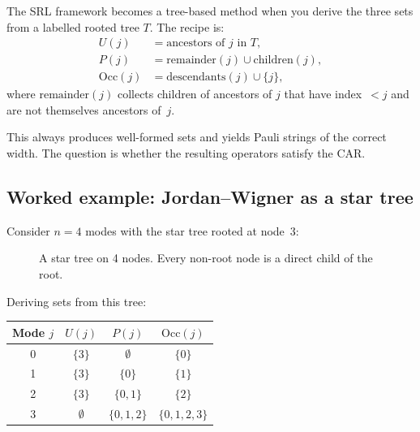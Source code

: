 \documentclass[11pt,a4paper]{article}
\newcommand{\Occ}[1]{\mathrm{Occ}(#1)}
\theoremstyle{definition}
\begin{document}
The SRL framework becomes a tree-based method when you derive the
three sets from a labelled rooted tree $T$.  The recipe is:
\begin{align*}
  U(j) &= \text{ancestors of } j \text{ in } T, \\
  P(j) &= \text{remainder}(j) \cup \text{children}(j), \\
  \Occ{j} &= \text{descendants}(j) \cup \{j\},
\end{align*}
where $\text{remainder}(j)$ collects children of ancestors of $j$
that have index~$< j$ and are not themselves ancestors of~$j$.

This always produces well-formed sets and yields Pauli strings of
the correct width.  The question is whether the resulting operators
satisfy the CAR.

\subsection{Worked example: Jordan--Wigner as a star tree}

Consider $n = 4$ modes with the star tree rooted at node~3:

\begin{figure}[h]
\centering
{}
\caption{A star tree on 4 nodes.  Every non-root node is a direct
child of the root.}
\label{fig:star-example}
\end{figure}

Deriving sets from this tree:

\begin{center}
\begin{tabular}{@{}cccc@{}}
\toprule
Mode $j$ & $U(j)$ & $P(j)$ & $\Occ{j}$ \\
\midrule
0 & $\{3\}$ & $\emptyset$ & $\{0\}$ \\
1 & $\{3\}$ & $\{0\}$ & $\{1\}$ \\
2 & $\{3\}$ & $\{0, 1\}$ & $\{2\}$ \\
3 & $\emptyset$ & $\{0, 1, 2\}$ & $\{0, 1, 2, 3\}$ \\
\bottomrule
\end{tabular}
\end{center}
\end{document}
